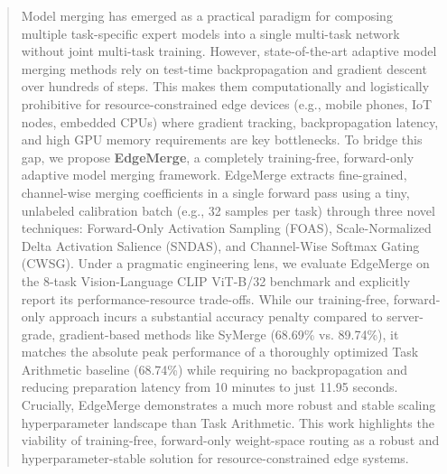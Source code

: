 \begin{abstract}
Model merging has emerged as a practical paradigm for composing multiple task-specific expert models into a single multi-task network without joint multi-task training. However, state-of-the-art adaptive model merging methods rely on test-time backpropagation and gradient descent over hundreds of steps. This makes them computationally and logistically prohibitive for resource-constrained edge devices (e.g., mobile phones, IoT nodes, embedded CPUs) where gradient tracking, backpropagation latency, and high GPU memory requirements are key bottlenecks. To bridge this gap, we propose \textbf{EdgeMerge}, a completely training-free, forward-only adaptive model merging framework. EdgeMerge extracts fine-grained, channel-wise merging coefficients in a single forward pass using a tiny, unlabeled calibration batch (e.g., 32 samples per task) through three novel techniques: Forward-Only Activation Sampling (FOAS), Scale-Normalized Delta Activation Salience (SNDAS), and Channel-Wise Softmax Gating (CWSG). Under a pragmatic engineering lens, we evaluate EdgeMerge on the 8-task Vision-Language CLIP ViT-B/32 benchmark and explicitly report its performance-resource trade-offs. While our training-free, forward-only approach incurs a substantial accuracy penalty compared to server-grade, gradient-based methods like SyMerge (68.69\% vs. 89.74\%), it matches the absolute peak performance of a thoroughly optimized Task Arithmetic baseline (68.74\%) while requiring no backpropagation and reducing preparation latency from 10 minutes to just 11.95 seconds. Crucially, EdgeMerge demonstrates a much more robust and stable scaling hyperparameter landscape than Task Arithmetic. This work highlights the viability of training-free, forward-only weight-space routing as a robust and hyperparameter-stable solution for resource-constrained edge systems.
\end{abstract}
